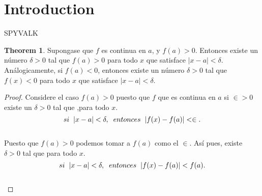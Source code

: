 \documentclass{article}
\theoremstyle{definition}
\newtheorem{theorem}{Theorem}[section]
\begin{document}
\section{Introduction}
SPYVALK

\begin{theorem}
Supongase que $f$ es continua en $a$, y $f(a)>0$. Entonces existe un número $\delta>0$ tal que $f(a)>0$ para todo $x$ que satisface $|x-a|<\delta$. Análogicamente, si $f(a)<0$, entonces existe un número $\delta>0$ tal que $f(x)<0$ para todo $x$ que satisface $|x-a|<\delta$.
\end{theorem}
\begin{proof}
  Considere el caso $f(a)>0$ puesto que $f$ que es continua en $a$ si $\in>0$ existe un $\delta>0$ tal que ,para todo $x$.\\
  \[si\hspace{0.2cm}|x-a|<\delta,\hspace{0.2cm} entonces \hspace{0.2cm}|f(x)-f(a)|<\in. \]\\
  Puesto que $f(a)>0$ podemos tomar a $f(a)$ como el $\in$. Así pues, existe $\delta>0$ tal que para todo $x$.\\
  \[si\hspace{0.2cm}|x-a|<\delta,\hspace{0.2cm} entonces \hspace{0.2cm}|f(x)-f(a)|<f(a). \]\\
\end{proof}
\end{document}
